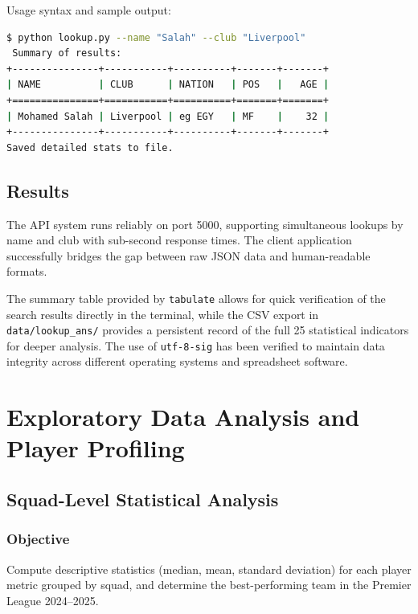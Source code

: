 \documentclass[a4paper,12pt]{report}
\begin{document}
Usage syntax and sample output:
\begin{lstlisting}[language=bash, caption={Command-line lookup usage and output}]
$ python lookup.py --name "Salah" --club "Liverpool"
 Summary of results: 
+---------------+-----------+----------+-------+-------+
| NAME          | CLUB      | NATION   | POS   |   AGE |
+===============+===========+==========+=======+=======+
| Mohamed Salah | Liverpool | eg EGY   | MF    |    32 |
+---------------+-----------+----------+-------+-------+
Saved detailed stats to file.
\end{lstlisting}

\section{Results}

The API system runs reliably on port 5000, supporting simultaneous lookups by name and club with sub-second response times. The client application successfully bridges the gap between raw JSON data and human-readable formats. 

The summary table provided by \texttt{tabulate} allows for quick verification of the search results directly in the terminal, while the CSV export in \texttt{data/lookup\_ans/} provides a persistent record of the full 25 statistical indicators for deeper analysis. The use of \texttt{utf-8-sig} has been verified to maintain data integrity across different operating systems and spreadsheet software.


\chapter{\texorpdfstring{Exploratory Data Analysis and\\ Player Profiling}{Exploratory Data Analysis and Player Profiling}}

\section{Squad-Level Statistical Analysis}

\subsection{Objective}

Compute descriptive statistics (median, mean, standard deviation) for each player metric grouped by squad, and determine the best-performing team in the Premier League 2024--2025.
\end{document}
